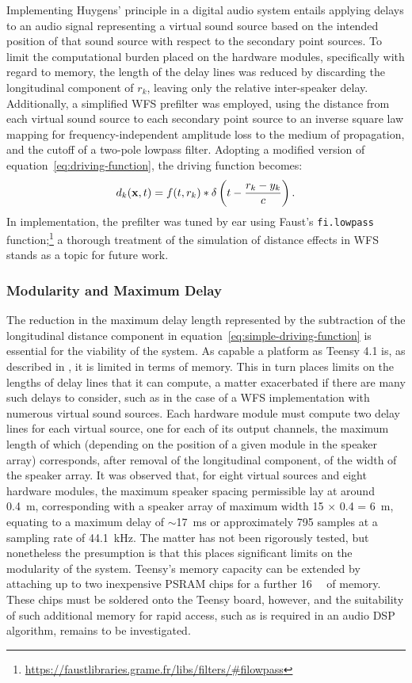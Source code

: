Implementing Huygens' principle in a digital audio system entails applying
delays to an audio signal representing a virtual sound source based on the
intended position of that sound source with respect to the secondary point
sources.
To limit the computational burden placed on the hardware modules, specifically
with regard to memory, the length of the delay lines was reduced by discarding
the longitudinal component of $r_k$, leaving only the relative inter-speaker
delay.
Additionally, a simplified WFS prefilter was employed, using the distance
from each virtual sound source to each secondary point source to an inverse
square law mapping for frequency-independent amplitude loss to the medium of
propagation, and the cutoff of a two-pole lowpass filter.
Adopting a modified version of equation~\eqref{eq:driving-function}, the
driving function becomes:
\begin{equation}
    \label{eq:simple-driving-function}
    d_k(\mathbf{x},t) = f(t, r_k) \ast \delta\left(t - \frac{r_k-y_k}{c}\right).
\end{equation}
In implementation, the prefilter was tuned by ear using Faust's
\texttt{fi.lowpass} function;\footnote{
    \url{https://faustlibraries.grame.fr/libs/filters/\#filowpass}
}
a thorough treatment of the simulation of distance effects in WFS stands as a
topic for future work.

\subsubsection{Modularity and Maximum Delay}

The reduction in the maximum delay length represented by the subtraction of
the longitudinal distance component in
equation~\eqref{eq:simple-driving-function} is essential for the viability of
the system.
As capable a platform as Teensy 4.1 is, as described in
, it is limited in terms of memory.
This in turn places limits on the lengths of delay lines that it can compute,
a matter exacerbated if there are many such delays to consider, such as in the
case of a WFS implementation with numerous virtual sound sources.
Each hardware module must compute two delay lines for each virtual source, one
for each of its output channels, the maximum length of which (depending on
the position of a given module in the speaker array) corresponds, after removal
of the longitudinal component, of the width of the speaker array.
It was observed that, for eight virtual sources and eight hardware modules,
the maximum speaker spacing permissible lay at around \qty{.4}{\m},
corresponding with a speaker array of maximum width 15 $\times$ 0.4 =
\qty{6}{\m}, equating to a maximum delay of $\sim$\qty{17}{\ms} or
approximately 795 samples at a sampling rate of \qty{44.1}{\kHz}.
The matter has not been rigorously tested, but nonetheless the presumption is
that this places significant limits on the modularity of the system.
Teensy's memory capacity can be extended by attaching up to two inexpensive
PSRAM chips for a further \qty{16}{\mega\byte} of memory.
These chips must be soldered onto the Teensy board, however, and the suitability
of such additional memory for rapid access, such as is required in an audio DSP
algorithm, remains to be investigated.

